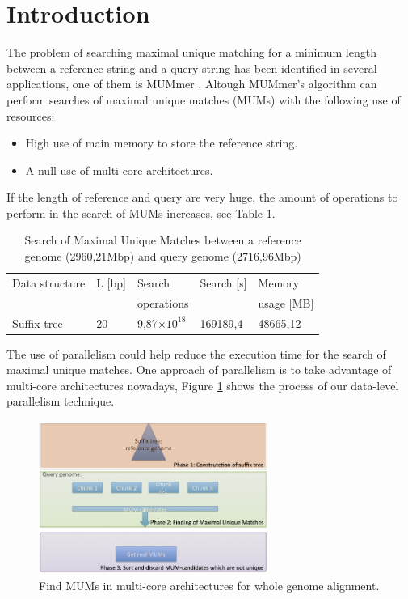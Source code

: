 \documentclass[3p,times]{elsarticle}
\providecommand{\e}[1]{\ensuremath{\times 10^{#1}}}
\begin{document}

\section{Introduction} 
\label{}
The problem of searching maximal unique matching for a minimum length between a reference
string and a query string has been
identified in several applications, one of them is MUMmer \cite{Delcher2003}. Altough
MUMmer's algorithm can perform searches of maximal unique matches (MUMs)
with the following use of resources:
\begin{itemize}
  \item High use of main memory to store the reference string.
  \item A null use of multi-core architectures.
\end{itemize}
If the length of reference and query are very huge, the amount of operations to perform
in the search of MUMs increases, see Table \ref{tbl:operations}.
\begin{table}[ h!]
  \begin{small}
    \begin{center}
      \begin{tabular}{lllll}
        Data structure & L [bp] & Search  & Search [s] & Memory\\
        & & operations & & usage [MB]\\
        \hline
        Suffix tree & 20 & 9,87\e{18}  & 169189,4 & 48665,12\\
        \hline
      \end{tabular}
    \end{center}
  \end{small}
  \caption{Search of Maximal Unique Matches between a reference genome (2960,21Mbp) and query genome (2716,96Mbp)}
  \label{tbl:operations}
\end{table}
The use of parallelism could help reduce the execution time for the search of maximal unique matches. One approach of
parallelism is to take advantage of multi-core architectures nowadays, Figure \ref{algorithm} shows the process of our data-level parallelism technique.\\
\begin{figure}[htb]   
\begin{center} 
  \includegraphics[width=7.5cm,height=5cm]{Phases.png}
\end{center} 
\caption{Find MUMs in multi-core architectures for whole genome alignment.} 
\label{algorithm} 
\end{figure} 
\end{document}
